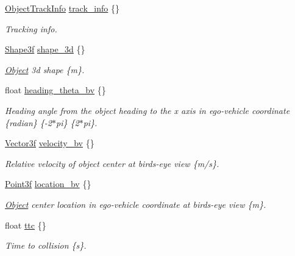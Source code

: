 \begin{DoxyCompactItemize}
\hyperlink{structmaf__perception__interface_1_1ObjectTrackInfo}{Object\+Track\+Info} \hyperlink{structmaf__perception__interface_1_1VisionAEBObject_a790f251361d1d482a34685637d16481d}{track\+\_\+info} \{\}
\begin{DoxyCompactList}\small\item\em Tracking info. \end{DoxyCompactList}\item 
\hyperlink{structmaf__perception__interface_1_1Shape3f}{Shape3f} \hyperlink{structmaf__perception__interface_1_1VisionAEBObject_a418c51654444b7e99ed88a94acf613f6}{shape\+\_\+3d} \{\}
\begin{DoxyCompactList}\small\item\em \hyperlink{structmaf__perception__interface_1_1Object}{Object} 3d shape \{m\}. \end{DoxyCompactList}\item 
float \hyperlink{structmaf__perception__interface_1_1VisionAEBObject_a3924fa788313de08bcbbaf3c9466a729}{heading\+\_\+theta\+\_\+bv} \{\}
\begin{DoxyCompactList}\small\item\em Heading angle from the object heading to the x axis in ego-\/vehicle coordinate \{radian\} \{-\/2$\ast$pi\} \{2$\ast$pi\}. \end{DoxyCompactList}\item 
\hyperlink{structmaf__perception__interface_1_1Vector3f}{Vector3f} \hyperlink{structmaf__perception__interface_1_1VisionAEBObject_abdd5c78a5ee7c9fd4e639887a985a116}{velocity\+\_\+bv} \{\}
\begin{DoxyCompactList}\small\item\em Relative velocity of object center at bird\textquotesingle{}s-\/eye view \{m/s\}. \end{DoxyCompactList}\item 
\hyperlink{structmaf__perception__interface_1_1Point3f}{Point3f} \hyperlink{structmaf__perception__interface_1_1VisionAEBObject_ab60904c38e8930b4aa545f3d091d7b07}{location\+\_\+bv} \{\}
\begin{DoxyCompactList}\small\item\em \hyperlink{structmaf__perception__interface_1_1Object}{Object} center location in ego-\/vehicle coordinate at bird\textquotesingle{}s-\/eye view \{m\}. \end{DoxyCompactList}\item 
float \hyperlink{structmaf__perception__interface_1_1VisionAEBObject_ae353abff6dd10e5840d098c909139cf3}{ttc} \{\}
\begin{DoxyCompactList}\small\item\em Time to collision \{s\}. \end{DoxyCompactList}\end{DoxyCompactItemize}


